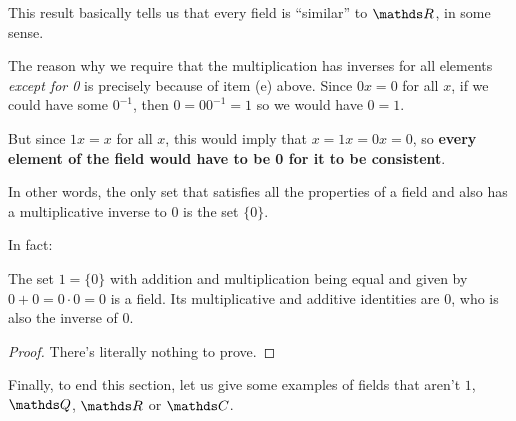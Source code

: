 This result basically tells us that every field is ``similar'' to $\R$, in some sense.

\begin{rmk}
	The reason why we require that the multiplication has inverses for all elements \textit{except for 0} is precisely because of item (e) above. Since $0x=0$ for all $x$, if we could have some $0^{-1}$, then $0=00^{-1}=1$ so we would have $0=1$.
	
	But since $1x=x$ for all $x$, this would imply that $x=1x=0x=0$, so \textbf{every element of the field would have to be 0 for it to be consistent}.
	
	In other words, the only set that satisfies all the properties of a field and also has a multiplicative inverse to 0 is the set $\{0\}$.
	
	In fact:
\end{rmk}

\begin{prop}
	The set $1=\{0\}$ with addition and multiplication being equal and given by $0+0=0\cdot 0=0$ is a field. Its multiplicative and additive identities are $0$, who is also the inverse of $0$.
\end{prop}
\begin{proof}
	There's literally nothing to prove.
\end{proof}

Finally, to end this section, let us give some examples of fields that aren't $1$, $\Q$, $\R$ or $\C$.

